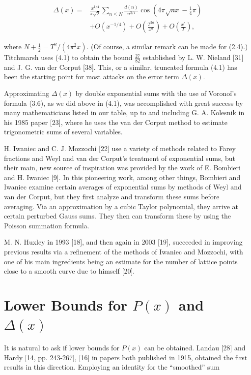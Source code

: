 \documentclass[10pt]{article}
\theoremstyle{plain}
\begin{document}
\begin{align*}
\Delta(x)= & \frac{x^{1 / 4}}{\pi \sqrt{2}} \sum_{n \leq N} \frac{d(n)}{n^{3 / 4}} \cos \left(4 \pi \sqrt{n x}-\frac{1}{4} \pi\right) \\
& +O\left(x^{-1 / 4}\right)+O\left(\frac{T^{2 a}}{x^{a}}\right)+O\left(\frac{x^{c}}{T}\right), \tag{4.1}
\end{align*}


where $N+\frac{1}{2}=T^{2} /\left(4 \pi^{2} x\right)$. (Of course, a similar remark can be made for (2.4).) Titchmarsh uses (4.1) to obtain the bound $\frac{27}{82}$ established by L. W. Nieland [31] and J. G. van der Corput [38]. This, or a similar, truncated formula (4.1) has been the starting point for most attacks on the error term $\Delta(x)$.

Approximating $\Delta(x)$ by double exponential sums with the use of Voronoï's formula (3.6), as we did above in (4.1), was accomplished with great success by many mathematicians listed in our table, up to and including G. A. Kolesnik in his 1985 paper [23], where he uses the van der Corput method to estimate trigonometric sums of several variables.

H. Iwaniec and C. J. Mozzochi [22] use a variety of methods related to Farey fractions and Weyl and van der Corput's treatment of exponential sums, but their main, new source of inspiration was provided by the work of E. Bombieri and H. Iwaniec [9]. In this pioneering work, among other things, Bombieri and Iwaniec examine certain averages of exponential sums by methods of Weyl and van der Corput, but they first analyze and transform these sums before averaging. Via an approximation by a cubic Taylor polynomial, they arrive at certain perturbed Gauss sums. They then can transform these by using the Poisson summation formula.

M. N. Huxley in 1993 [18], and then again in 2003 [19], succeeded in improving previous results via a refinement of the methods of Iwaniec and Mozzochi, with one of his main ingredients being an estimate for the number of lattice points close to a smooth curve due to himself [20].

\section{Lower Bounds for \texorpdfstring{$P(x)$ and $\Delta(x)$}{P(x) and Delta(x)}}

It is natural to ask if lower bounds for $P(x)$ can be obtained. Landau [28] and Hardy [14, pp. 243-267], [16] in papers both published in 1915, obtained the first results in this direction. Employing an identity for the ``smoothed'' sum
\end{document}
